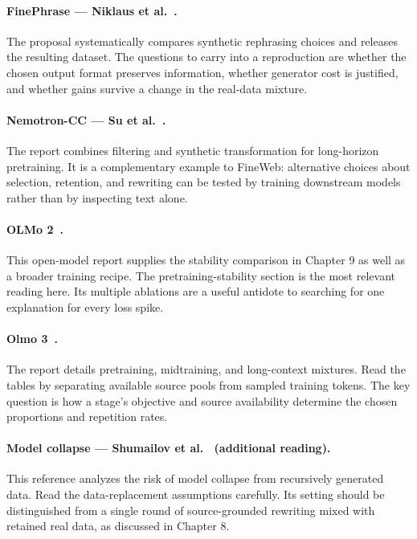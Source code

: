 \paragraph{FinePhrase --- Niklaus et al.~\cite{finephrase}.}
The proposal systematically compares synthetic rephrasing choices and releases the resulting dataset. The questions to carry into a reproduction are whether the chosen output format preserves information, whether generator cost is justified, and whether gains survive a change in the real-data mixture.

\paragraph{Nemotron-CC --- Su et al.~\cite{nemotron}.}
The report combines filtering and synthetic transformation for long-horizon pretraining. It is a complementary example to FineWeb: alternative choices about selection, retention, and rewriting can be tested by training downstream models rather than by inspecting text alone.

\paragraph{OLMo 2~\cite{olmo2}.}
This open-model report supplies the stability comparison in Chapter 9 as well as a broader training recipe. The pretraining-stability section is the most relevant reading here. Its multiple ablations are a useful antidote to searching for one explanation for every loss spike.

\paragraph{Olmo 3~\cite{olmo3}.}
The report details pretraining, midtraining, and long-context mixtures. Read the tables by separating available source pools from sampled training tokens. The key question is how a stage's objective and source availability determine the chosen proportions and repetition rates.

\paragraph{Model collapse --- Shumailov et al.~\cite{collapse} (additional reading).}
This reference analyzes the risk of model collapse from recursively generated data. Read the data-replacement assumptions carefully. Its setting should be distinguished from a single round of source-grounded rewriting mixed with retained real data, as discussed in Chapter 8.

